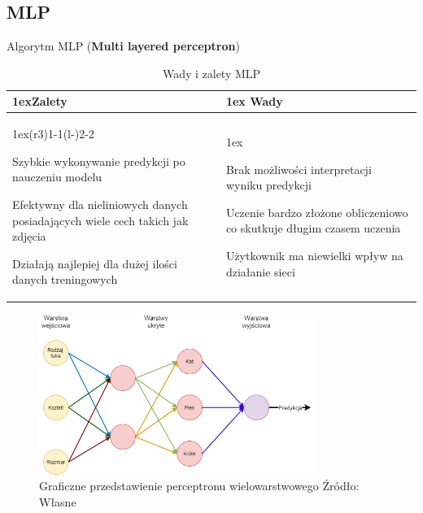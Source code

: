 \subsection{MLP}

Algorytm MLP (\textbf{Multi layered perceptron})

\begin{table}[h]
    \begin{tabularx}{\linewidth}{>{\parskip1ex}X@{\kern4\tabcolsep}>{\parskip1ex}X}
    \toprule
    \hfil\bfseries Zalety
    &
    \hfil\bfseries Wady
    \\\cmidrule(r{3\tabcolsep}){1-1}\cmidrule(l{-\tabcolsep}){2-2}
    
    Szybkie wykonywanie predykcji po nauczeniu modelu\par
    Efektywny dla nieliniowych danych posiadających wiele cech takich jak zdjęcia\par
    Działają najlepiej dla dużej ilości danych treningowych\par
    &
    
    Brak możliwości interpretacji wyniku predykcji\par
    Uczenie bardzo złożone obliczeniowo co skutkuje długim czasem uczenia\par
    Użytkownik ma niewielki wpływ na działanie sieci\par
    \\\bottomrule
    \end{tabularx}
    \caption{Wady i zalety MLP}
\end{table}

\begin{figure}[h]
    \centering
    \includegraphics[width=0.8\textwidth]{./Img/MLP.png}
    \caption{Graficzne przedstawienie perceptronu wielowarstwowego Źródło: Własne}
\end{figure}

